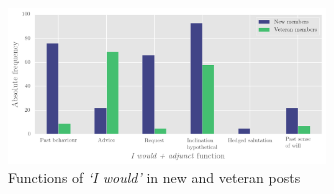     \begin{figure}[htb]
    \centering
    \includegraphics[width=0.75\textwidth]{../images/iwould-vid.png}
    \caption{Functions of \emph{`I would'} in new and veteran posts}
    \label{fig:i_would_func}
    \end{figure}
    
    
    
    
    
